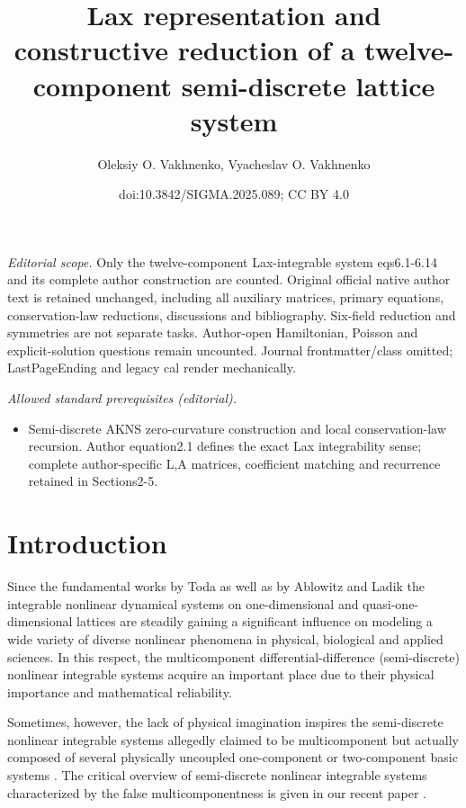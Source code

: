 \documentclass[10pt,a4paper]{amsart}
\title{Lax representation and constructive reduction of a twelve-component semi-discrete lattice system}
\author{Oleksiy O. Vakhnenko, Vyacheslav O. Vakhnenko}
\date{doi:10.3842/SIGMA.2025.089; CC BY 4.0}
\numberwithin{equation}{section}
\begin{document}
\maketitle
\noindent\textit{Editorial scope.} Only the twelve-component Lax-integrable system eqs6.1-6.14 and its complete author construction are counted. Original official native author text is retained unchanged, including all auxiliary matrices, primary equations, conservation-law reductions, discussions and bibliography. Six-field reduction and symmetries are not separate tasks. Author-open Hamiltonian, Poisson and explicit-solution questions remain uncounted. Journal frontmatter/class omitted; LastPageEnding and legacy cal render mechanically.\par\medskip
\noindent\textit{Allowed standard prerequisites (editorial).}\begin{itemize}
\item Semi-discrete AKNS zero-curvature construction and local conservation-law recursion. Author equation2.1 defines the exact Lax integrability sense; complete author-specific L,A matrices, coefficient matching and recurrence retained in Sections2-5.
\end{itemize}\medskip
\section{Introduction}

Since the fundamental works by Toda \cite{toda-JPSJ-22-431, toda-JPSJ-23-501, toda-PhR-18-1} as well as by Ablowitz and Ladik \mbox{\cite{ ablowitz-SAM-58-17,ablowitz-SAM-55-213, ablowitz-JMP-17-1011}} the integrable nonlinear dynamical systems on one-dimensional and quasi-one-dimensional lattices
are steadily gaining a significant influence on modeling a wide variety of diverse nonlinear phenomena in physical, biological and applied sciences. In this respect, the multicomponent differential-difference (semi-discrete) nonlinear integrable systems \cite{ablowitz-PLA-253-287, ablowitz-CSR-11-159,gerdzhikov-TMP-52-676, tsuchida-JMP-39-4785, tsuchida-JPA-32-2239, vakhnenko-JPA-32-5735, vakhnenko-PRE-60-R2492,vakhnenko-JNMP-24-250, vakhnenko-PRE-61-7110, vakhnenko-EPJP-137-1176} acquire an important place due to their physical importance and mathematical reliability.

Sometimes, however, the lack of physical imagination inspires the semi-discrete nonlinear integrable systems allegedly claimed to be multicomponent but actually composed of several physically uncoupled one-component or two-component basic systems \cite{babalic-RJP-63-114, babalic-IJMPB-34-2050274,babalic-JPA-50-415201,carstea-JPA-48-055205, wen-AML-123-107591,yu-WM-94-102500, yuan-CSF-168-113180}. The critical overview of semi-discrete nonlinear integrable systems characterized by the false multicomponentness is given in our recent paper \cite{vakhnenko-PLA-452-128460}.
\end{document}
